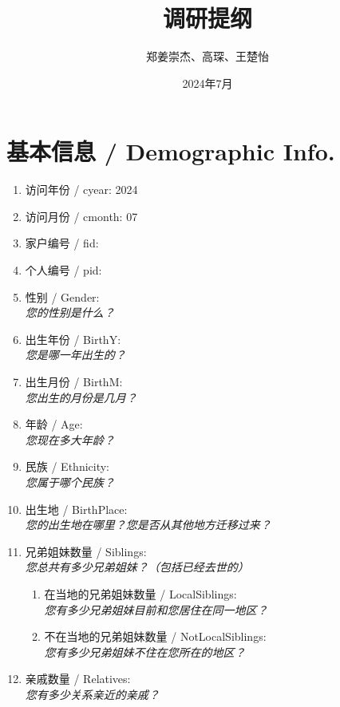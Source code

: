 \documentclass[12pt]{article}
\title{调研提纲}
\author{郑姜崇杰、高琛、王楚怡}
\date{2024年7月}
\begin{document}
\maketitle

\section{基本信息 / Demographic Info.}
\begin{enumerate}
    \item 访问年份 / cyear: 2024\\

    \item 访问月份 / cmonth: 07\\

    \item 家户编号 / fid: \\

    \item 个人编号 / pid: \\

    \item 性别 / Gender: \\
    \textit{您的性别是什么？}
   \item 出生年份 / BirthY: \\
    \textit{您是哪一年出生的？}
    \item 出生月份 / BirthM: \\
    \textit{您出生的月份是几月？}
    \item 年龄 / Age: \\
    \textit{您现在多大年龄？}
    \item 民族 / Ethnicity: \\
    \textit{您属于哪个民族？}
    \item 出生地 / BirthPlace: \\
    \textit{您的出生地在哪里？您是否从其他地方迁移过来？}
    \item 兄弟姐妹数量 / Siblings: \\
    \textit{您总共有多少兄弟姐妹？（包括已经去世的）}
    
    \begin{enumerate}
        \item 在当地的兄弟姐妹数量 / LocalSiblings: \\
        \textit{您有多少兄弟姐妹目前和您居住在同一地区？}
        \item 不在当地的兄弟姐妹数量 / NotLocalSiblings: \\
        \textit{您有多少兄弟姐妹不住在您所在的地区？}
    \end{enumerate}
    \item 亲戚数量 / Relatives: \\
    \textit{您有多少关系亲近的亲戚？}
    

\end{enumerate}
\end{document}
